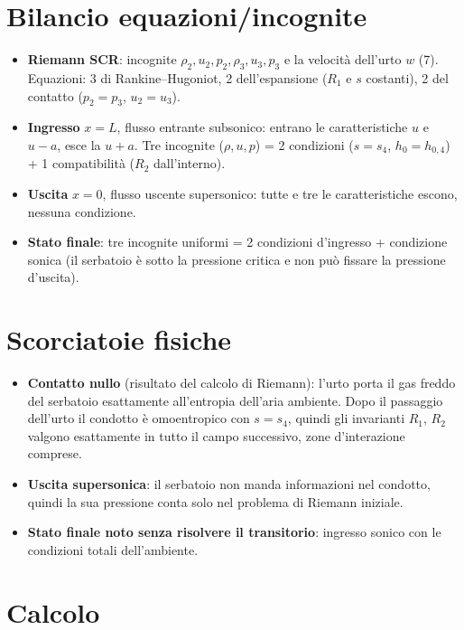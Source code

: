 \documentclass[11pt,a4paper]{article}
\newcommand{\uma}{u-a}
\newcommand{\upa}{u+a}
\begin{document}
\section{Bilancio equazioni/incognite}
\begin{itemize}
\item \textbf{Riemann SCR}: incognite $\rho_2,u_2,p_2,\rho_3,u_3,p_3$ e la velocità dell'urto $w$ (7). Equazioni:
  3 di Rankine--Hugoniot, 2 dell'espansione ($R_1$ e $s$ costanti), 2 del contatto ($p_2=p_3$, $u_2=u_3$).
\item \textbf{Ingresso} $x=L$, flusso entrante subsonico: entrano le caratteristiche $u$ e $\uma$, esce la $\upa$.
  Tre incognite ($\rho,u,p$) = 2 condizioni ($s=s_4$, $h_0=h_{0,4}$) + 1 compatibilità ($R_2$ dall'interno).
\item \textbf{Uscita} $x=0$, flusso uscente supersonico: tutte e tre le caratteristiche escono, nessuna condizione.
\item \textbf{Stato finale}: tre incognite uniformi = 2 condizioni d'ingresso + condizione sonica (il serbatoio è
  sotto la pressione critica e non può fissare la pressione d'uscita).
\end{itemize}

\section{Scorciatoie fisiche}
\begin{itemize}
\item \textbf{Contatto nullo} (risultato del calcolo di Riemann): l'urto porta il gas freddo del serbatoio
  esattamente all'entropia dell'aria ambiente. Dopo il passaggio dell'urto il condotto è omoentropico con $s=s_4$,
  quindi gli invarianti $R_1$, $R_2$ valgono esattamente in tutto il campo successivo, zone d'interazione comprese.
\item \textbf{Uscita supersonica}: il serbatoio non manda informazioni nel condotto, quindi la sua pressione conta
  solo nel problema di Riemann iniziale.
\item \textbf{Stato finale noto senza risolvere il transitorio}: ingresso sonico con le condizioni totali
  dell'ambiente.
\end{itemize}

\section{Calcolo}
\label{sec:calcolo}
\end{document}
